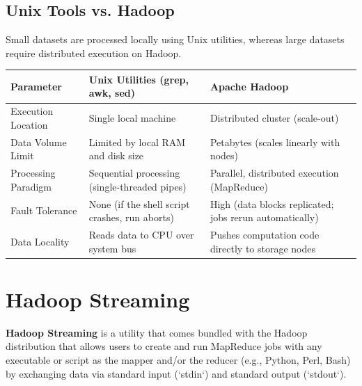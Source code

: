 \documentclass[12pt,a4paper]{article}
\renewcommand{\arraystretch}{1.45}
\begin{document}
\subsection{Unix Tools vs. Hadoop}
Small datasets are processed locally using Unix utilities, whereas large datasets require distributed execution on Hadoop.

\par\vspace{6pt}\noindent
{\renewcommand{\arraystretch}{1.4}%
\begin{tabularx}{\linewidth}{|B{3.2cm}|Y|Y|}
\hline
\textbf{Parameter} & \textbf{Unix Utilities (grep, awk, sed)} & \textbf{Apache Hadoop} \\
\hline
Execution Location & Single local machine & Distributed cluster (scale-out) \\
\hline
Data Volume Limit & Limited by local RAM and disk size & Petabytes (scales linearly with nodes) \\
\hline
Processing Paradigm & Sequential processing (single-threaded pipes) & Parallel, distributed execution (MapReduce) \\
\hline
Fault Tolerance & None (if the shell script crashes, run aborts) & High (data blocks replicated; jobs rerun automatically) \\
\hline
Data Locality & Reads data to CPU over system bus & Pushes computation code directly to storage nodes \\
\hline
\end{tabularx}}

\section{Hadoop Streaming}

\begin{tcolorbox}[defbox, title={Hadoop Streaming}]
  \textbf{Hadoop Streaming} is a utility that comes bundled with the Hadoop distribution that allows users to create and run MapReduce jobs with any executable or script as the mapper and/or the reducer (e.g., Python, Perl, Bash) by exchanging data via standard input (`stdin`) and standard output (`stdout`).
\end{tcolorbox}
\end{document}
